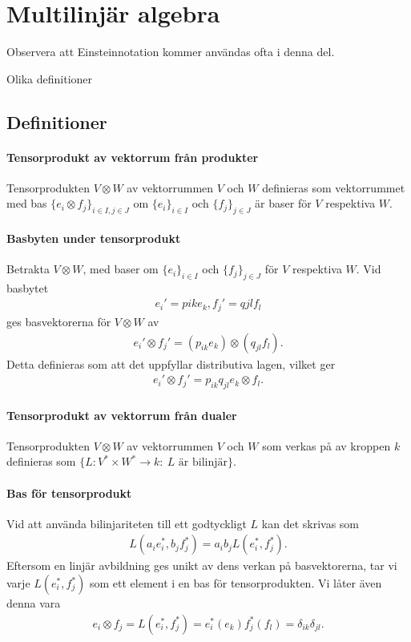 \section{Multilinjär algebra}

Observera att Einsteinnotation kommer användas ofta i denna del.

Olika definitioner

\subsection{Definitioner}

\paragraph{Tensorprodukt av vektorrum från produkter}
Tensorprodukten $V\otimes W$ av vektorrummen $V$ och $W$ definieras som vektorrummet med bas $\{e_{i}\otimes f_{j}\}_{i\in I, j\in J}$ om $\{e_{i}\}_{i\in I}$ och $\{f_{j}\}_{j\in J}$ är baser för $V$ respektiva $W$.

\paragraph{Basbyten under tensorprodukt}
Betrakta $V\otimes W$, med baser om $\{e_{i}\}_{i\in I}$ och $\{f_{j}\}_{j\in J}$ för $V$ respektiva $W$. Vid basbytet
\begin{align*}
	e_{i}' = p{ik}e_{k}, f_{j}' = q{jl}f_{l}
\end{align*}
ges basvektorerna för $V\otimes W$ av
\begin{align*}
	e_{i}'\otimes f_{j}' = (p_{ik}e_{k})\otimes (q_{jl}f_{l}).
\end{align*}
Detta definieras som att det uppfyllar distributiva lagen, vilket ger
\begin{align*}
	e_{i}'\otimes f_{j}' = p_{ik}q_{jl}e_{k}\otimes f_{l}.
\end{align*}

\paragraph{Tensorprodukt av vektorrum från dualer}
Tensorprodukten $V\otimes W$ av vektorrummen $V$ och $W$ som verkas på av kroppen $k$ definieras som $\{L: V^{*}\times W^{*}\to k:\ L\text{ är bilinjär}\}$.

\paragraph{Bas för tensorprodukt}
Vid att använda bilinjariteten till ett godtyckligt $L$ kan det skrivas som
\begin{align*}
	L(a_{i}e_{i}^{*}, b_{j}f_{j}^{*}) = a_{i}b_{j}L(e_{i}^{*}, f_{j}^{*}).
\end{align*}
Eftersom en linjär avbildning ges unikt av dens verkan på basvektorerna, tar vi varje $L(e_{i}^{*}, f_{j}^{*})$ som ett element i en bas för tensorprodukten. Vi låter även denna vara
\begin{align*}
	e_{i}\otimes f_{j} = L(e_{i}^{*}, f_{j}^{*}) = e_{i}^{*}(e_{k})f_{j}^{*}(f_{l}) = \delta_{ik}\delta_{jl}.
\end{align*}

